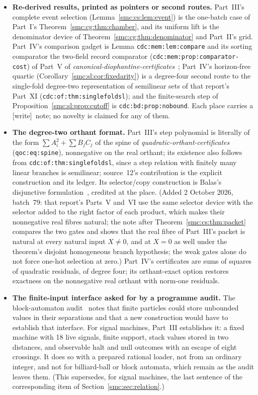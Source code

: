 \documentclass[11pt,letterpaper]{article}
\numberwithin{equation}{section}
\theoremstyle{definition}
\theoremstyle{remark}
\newcommand{\wtag}{\textup{[write]}}
\begin{document}
\begin{itemize}
\item \textbf{Re-derived results, printed as pointers or second routes.} Part~III's complete event selection (Lemma~\ref{smc:cs:lem:event}) is the one-batch case of Part~I's Theorem~\ref{smc:cg:thm:chamber}, and its uniform lift is the denominator device of Theorem~\ref{smc:cg:thm:denominator} and Part~II's grid. Part~IV's comparison gadget is Lemma \texttt{cdc:mem:lem:compare} and its sorting comparator the two-field record comparator (\texttt{cdc:mem:prop:comparator-cost}) of Part~V of \emph{canonical-diophantine-certificates}~\cite{cdc}; Part~IV's horizon-free quartic (Corollary~\ref{smc:sl:cor:fixedarity}) is a degree-four second route to the single-fold degree-two representation of semilinear sets of that report's Part~XI (\texttt{cdc:of:thm:singlefoldsl}); and the finite-search step of Proposition~\ref{smc:sl:prop:cutoff} is \texttt{cdc:bd:prop:nobound}. Each place carries a \wtag\ note; no novelty is claimed for any of them.
\item \textbf{The degree-two orthant format.} Part~III's step polynomial is literally of the form $\sum A_i^2+\sum B_jC_j$ of the spine of \emph{quadratic-orthant-certificates} (\texttt{qoc:eq:spine}), nonnegative on the real orthant; its existence also follows from \texttt{cdc:of:thm:singlefoldsl}, since a step relation with finitely many linear branches is semilinear; source~12's contribution is the explicit construction and its ledger. Its selector/copy construction is Balas's disjunctive formulation~\cite{balas1979,balas1985,jeroslowlowe}, credited at the place. (Added 2 October 2026, batch~79: that report's Parts~V and~VI use the same selector device with the selector added to the right factor of each product, which makes their nonnegative real fibres natural; the note after Theorem~\ref{smc:cs:thm:packet} compares the two gates and shows that the real fibre of Part~III's packet is natural at every natural input $X\ne0$, and at $X=0$ as well under the theorem's disjoint homogeneous branch hypothesis; the weak gates alone do not force one-hot selection at zero.) Part~IV's certificates are sums of squares of quadratic residuals, of degree four; its orthant-exact option restores exactness on the nonnegative real orthant with norm-one residuals.
\item \textbf{The finite-input interface asked for by a programme audit.} The block-automaton audit~\cite{blockca} notes that finite particles could store unbounded values in their separations and that a new construction would have to establish that interface. For signal machines, Part~III establishes it: a fixed machine with 18 live signals, finite support, stack values stored in two distances, and observable halt and null outcomes with an escape of eight crossings. It does so with a prepared rational loader, not from an ordinary integer, and not for billiard-ball or block automata, which remain as the audit leaves them. (This supersedes, for signal machines, the last sentence of the corresponding item of Section~\ref{smc:sec:relation}.)

\end{itemize}
\end{document}
